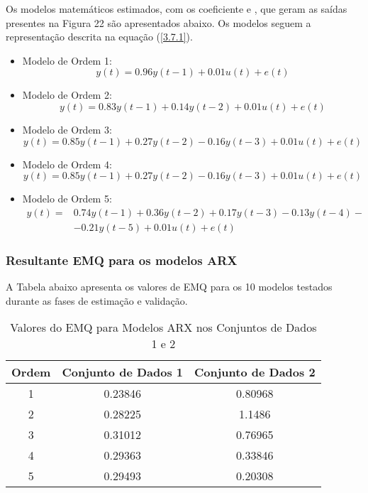 \documentclass[a4paper,12pt]{article}
\begin{document}
Os modelos matemáticos estimados, com os coeficiente  e , que geram as saídas presentes na Figura 22 são apresentados abaixo. Os modelos seguem a representação descrita na equação (\ref{3.7.1}).
\begin{itemize}
    \item Modelo de Ordem 1:
    \begin{equation*}
    y(t) = 0.96y(t-1) + 0.01u(t) + e(t)
    \end{equation*}
    
    \item Modelo de Ordem 2:
    \begin{equation*}
    y(t) = 0.83y(t-1) + 0.14y(t-2) + 0.01u(t) + e(t)
    \end{equation*}
    
    \item Modelo de Ordem 3:
    \begin{equation*}
    y(t) = 0.85y(t-1) + 0.27y(t-2) - 0.16y(t-3) + 0.01u(t) + e(t)
    \end{equation*}
    
    \item Modelo de Ordem 4:
    \begin{equation*}
    y(t) = 0.85y(t-1) + 0.27y(t-2) - 0.16y(t-3) + 0.01u(t) + e(t)
    \end{equation*}
    
    \item Modelo de Ordem 5:
    \begin{align}
    y(t) = &0.74y(t-1) + 0.36y(t-2) + 0.17y(t-3) - 0.13y(t-4) - \nonumber \\
    & - 0.21y(t-5) + 0.01u(t) + e(t) \nonumber
    \end{align}
\end{itemize}

\subsubsection{Resultante EMQ para os modelos ARX}

A Tabela abaixo apresenta os valores de EMQ para os 10 modelos testados durante as fases de estimação e validação.

\begin{table}[h!]
    \centering
    \label{tab:emq_results_arx}
    \begin{tabular}{|c|c|c|}
        \hline
        Ordem & Conjunto de Dados 1 & Conjunto de Dados 2 \\
        \hline
        1 & 0.23846 & 0.80968 \\
        2 & 0.28225 & 1.1486 \\
        3 & 0.31012 & 0.76965 \\
        4 & 0.29363 & 0.33846 \\
        5 & 0.29493 & 0.20308 \\
        \hline
    \end{tabular}
    \caption{Valores do EMQ para Modelos ARX nos Conjuntos de Dados 1 e 2}
\end{table}
\end{document}
